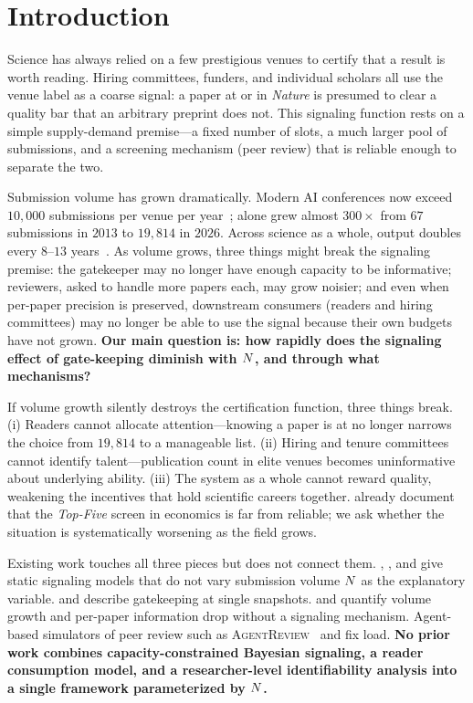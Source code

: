 \section{Introduction}
\label{sec:intro}

Science has always relied on a few prestigious venues to certify that a result is worth reading. Hiring committees, funders, and individual scholars all use the venue label as a coarse signal: a paper at \iclr or in \emph{Nature} is presumed to clear a quality bar that an arbitrary preprint does not. This signaling function rests on a simple supply-demand premise---a fixed number of slots, a much larger pool of submissions, and a screening mechanism (peer review) that is reliable enough to separate the two.

Submission volume has grown dramatically. Modern AI conferences now exceed $10{,}000$ submissions per venue per year~\citep{yang2025papercopilot}; \iclr alone grew almost $300\times$ from $67$ submissions in $2013$ to $19{,}814$ in $2026$. Across science as a whole, output doubles every $8$--$13$ years~\citep{bornmann2015growth}. As volume grows, three things might break the signaling premise: the gatekeeper may no longer have enough capacity to be informative; reviewers, asked to handle more papers each, may grow noisier; and even when per-paper precision is preserved, downstream consumers (readers and hiring committees) may no longer be able to use the signal because their own budgets have not grown. {\bf Our main question is: how rapidly does the signaling effect of gate-keeping diminish with $N$, and through what mechanisms?}

 If volume growth silently destroys the certification function, three things break. (i) Readers cannot allocate attention---knowing a paper is at \iclr no longer narrows the choice from $19{,}814$ to a manageable list. (ii) Hiring and tenure committees cannot identify talent---publication count in elite venues becomes uninformative about underlying ability. (iii) The system as a whole cannot reward quality, weakening the incentives that hold scientific careers together. \citet{heckman2019tyranny} already document that the \emph{Top-Five} screen in economics is far from reliable; we ask whether the situation is systematically worsening as the field grows.

 Existing work touches all three pieces but does not connect them. \citet{akerlof1970lemons}, \citet{spence1973job}, and \citet{long2023lemons} give static signaling models that do not vary submission volume $N$ as the explanatory variable. \citet{heckman2019tyranny} and \citet{kwiek2026topperformers} describe gatekeeping at single snapshots. \citet{bornmann2015growth} and \citet{fu2021disproportion} quantify volume growth and per-paper information drop without a signaling mechanism. Agent-based simulators of peer review such as \textsc{AgentReview}~\citep{jin2024agentreview} and \citet{grimaldo2018reputation} fix load. {\bf No prior work combines capacity-constrained Bayesian signaling, a reader consumption model, and a researcher-level identifiability analysis into a single framework parameterized by $N$.}

